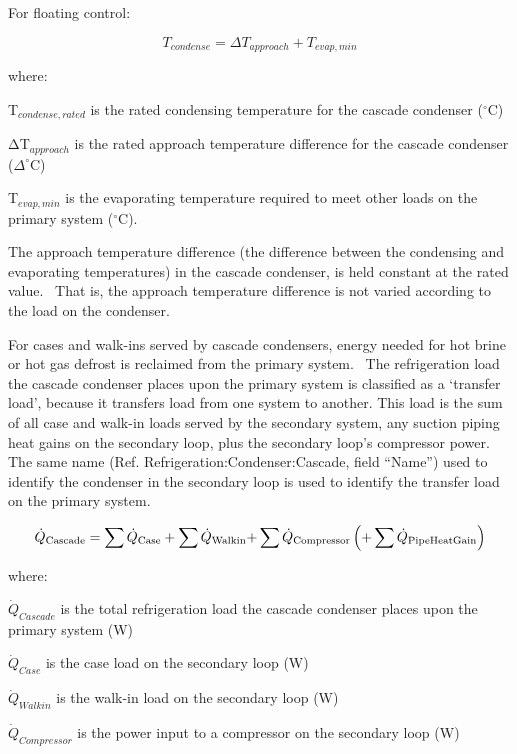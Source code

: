 For floating control:

\begin{equation}
T_{condense} = \Delta{T_{approach}} + T_{evap,min}
\end{equation}

where:

T\(_{condense,rated}\) is the rated condensing temperature for the cascade condenser (\(^{\circ}\)C)

ΔT\(_{approach}\) is the rated approach temperature difference for the cascade condenser (\(\Delta^{\circ}\)C)

T\(_{evap,min}\) is the evaporating temperature required to meet other loads on the primary system (\(^{\circ}\)C).

The approach temperature difference (the difference between the condensing and evaporating temperatures) in the cascade condenser, is held constant at the rated value.~ That is, the approach temperature difference is not varied according to the load on the condenser.

For cases and walk-ins served by cascade condensers, energy needed for hot brine or hot gas defrost is reclaimed from the primary system.~ The refrigeration load the cascade condenser places upon the primary system is classified as a `transfer load', because it transfers load from one system to another. This load is the sum of all case and walk-in loads served by the secondary system, any suction piping heat gains on the secondary loop, plus the secondary loop's compressor power. The same name (Ref. Refrigeration:Condenser:Cascade, field ``Name'') used to identify the condenser in the secondary loop is used to identify the transfer load on the primary system.

\begin{equation}
{\dot Q_{{\rm{Cascade}}}} = {\sum {\dot Q}_{{\rm{Case}}}} + \sum {{{\dot Q}_{{\rm{Walkin}}}} + } \sum {{{\dot Q}_{{\rm{Compressor}}}}} \left( { + \sum {{{\dot Q}_{{\rm{PipeHeatGain}}}}} } \right)
\end{equation}

where:

\({\dot Q_{Cascade}}\) is the total refrigeration load the cascade condenser places upon the primary system (W)

\({\dot Q_{Case}}\) is the case load on the secondary loop (W)

\({\dot Q_{Walkin}}\) is the walk-in load on the secondary loop (W)

\({\dot Q_{Compressor}}\) is the power input to a compressor on the secondary loop (W)

